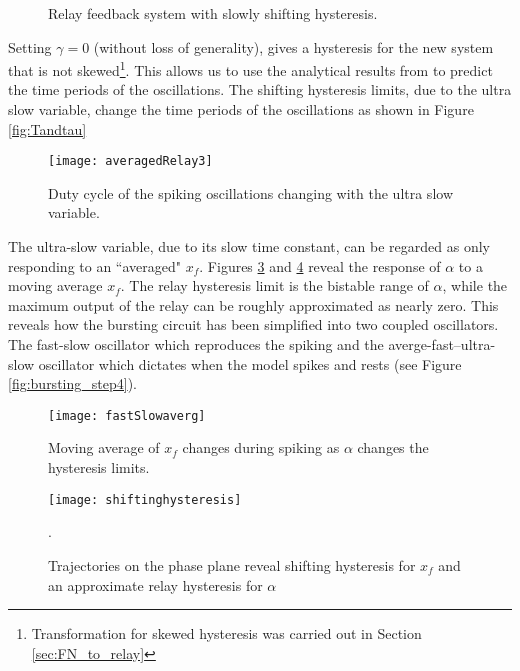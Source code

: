 \documentclass[a4paper, 12pt]{article}
\begin{document}
\begin{figure}
\caption{Relay feedback system with slowly shifting hysteresis.}
\label{fig:bursting_step2}
\end{figure}

Setting $\gamma = 0$ (without loss of generality), gives a hysteresis for the new system that is not skewed\footnote{Transformation for skewed hysteresis was carried out in Section \ref{sec:FN_to_relay}}. This allows us to use the analytical results from \cite{astrom1995} to predict the time periods of the oscillations. The shifting hysteresis limits, due to the ultra slow variable, change the time periods of the oscillations as shown in Figure \ref{fig:Tandtau}

\begin{figure}
\texttt{[image: averagedRelay3]}
\caption{Duty cycle of the spiking oscillations changing with the ultra slow variable.}
\label{fig:bursting_step2.1}
\end{figure}

The ultra-slow variable, due to its slow time constant, can be regarded as only responding to an ``averaged" $x_f$. Figures \ref{fig:bursting_step3.1} and \ref{fig:bursting_step3.2} reveal the response of $\alpha$ to a moving average $x_f$. The relay hysteresis limit is the bistable range of $\alpha$, while the maximum output of the relay can be roughly approximated as nearly zero. This reveals how the bursting circuit has been simplified into two coupled oscillators. The fast-slow oscillator which reproduces the spiking and the averge-fast--ultra-slow oscillator which dictates when the model spikes and rests (see Figure \ref{fig:bursting_step4}). 

\begin{figure}
\texttt{[image: fastSlowaverg]}
\caption{Moving average of $x_f$ changes during spiking as $\alpha$ changes the hysteresis limits.}
\label{fig:bursting_step3.1}
\end{figure}

\begin{figure}
\texttt{[image: shiftinghysteresis]}
\caption{Trajectories on the phase plane reveal shifting hysteresis for $x_f$ and an approximate relay hysteresis for $\alpha$}.
\label{fig:bursting_step3.2}
\end{figure}
\end{document}
